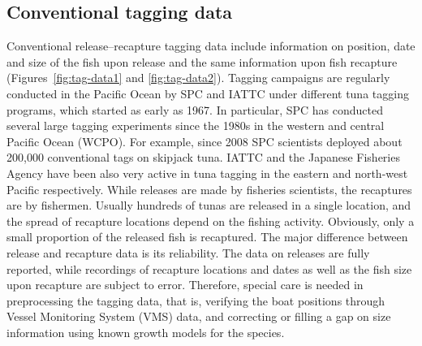 \subsection{Conventional tagging data}\label{sec:integrating-tags}

Conventional release--recapture tagging data include information on position, date and size of the fish upon release and the same information upon fish recapture (Figures~\ref{fig:tag-data1} and \ref{fig:tag-data2}). Tagging campaigns are regularly conducted in the Pacific Ocean by SPC and IATTC under different tuna tagging programs, which started as early as 1967. In particular, SPC has conducted several large tagging experiments since the 1980s in the western and central Pacific Ocean (WCPO). For example, since 2008 SPC scientists deployed about 200,000 conventional tags on skipjack tuna. IATTC and the Japanese Fisheries Agency have been also very active in tuna tagging in the eastern and north-west Pacific respectively. While releases are made by fisheries scientists, the recaptures are by fishermen. Usually hundreds of tunas are released in a single location, and the spread of recapture locations depend on the fishing activity. Obviously, only a small proportion of the released fish is recaptured. The major difference between release and recapture data is its reliability. The data on releases are fully reported, while recordings of recapture locations and dates as well as the fish size upon recapture are subject to error. Therefore, special care is needed in preprocessing the tagging data, that is, verifying the boat positions through Vessel Monitoring System (VMS) data, and correcting or filling a gap on size information using known growth models for the species. 

